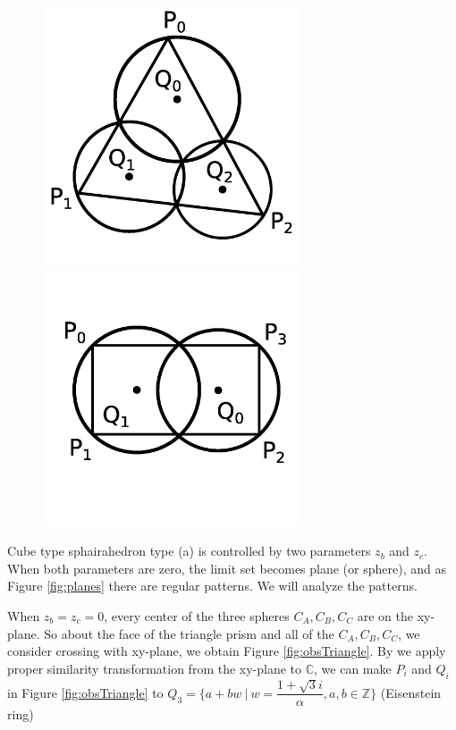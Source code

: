 \documentclass[suppldata, dvipdfmx]{interact}
\theoremstyle{plain}%
\theoremstyle{definition}
\theoremstyle{remark}
\theoremstyle{problemstyle}
\begin{document}
\begin{figure}[h!tbp]
 \begin{minipage}[t]{0.5\textwidth}
 \centering
 \includegraphics[width=3in,
 keepaspectratio]{./img/Observation/triangle.jpg}
 \caption{}
 \label{fig:obsTriangle}
 \end{minipage}
 \hspace*{\fill}
 \begin{minipage}[t]{0.5\textwidth}
  \centering
  \includegraphics[width=3in,
  keepaspectratio]{./img/Observation/rect.jpg}
  \caption{}
  \label{fig:obsRect}
 \end{minipage}
 \hspace*{\fill}
\end{figure}

Cube type sphairahedron type (a) is controlled by two parameters $z_b$
and $z_c$.
When both parameters are zero, the limit set becomes plane (or
sphere), and as Figure \ref{fig:planes} there are
regular patterns. We will analyze the patterns.

When $z_b = z_c = 0$, every center of the three spheres $C_A, C_B, C_C$
are on the xy-plane. So about the face of the triangle prism and all of the
$C_A, C_B, C_C$, we consider crossing with xy-plane, we obtain Figure
\ref{fig:obsTriangle}.
By we apply proper similarity transformation from the xy-plane to
$\mathbb{C}$, we can make $P_i$ and $Q_i$ in
Figure \ref{fig:obsTriangle} to
$Q_3 = \{ a+bw~|~w=\dfrac{1 + \sqrt{3}i}{\alpha}, a, b \in \mathbb{Z}\}$
(Eisenstein ring)
\end{document}
